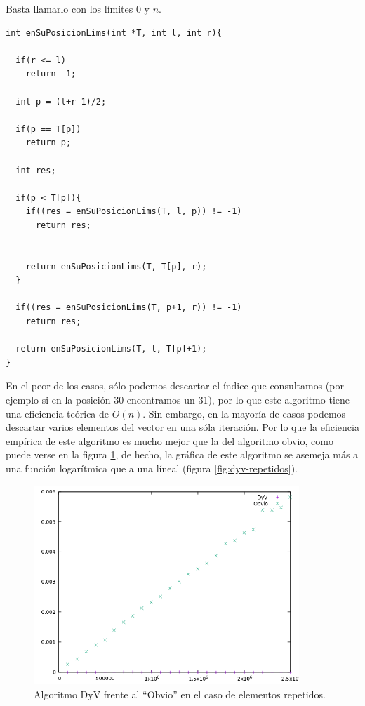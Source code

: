 \documentclass[a4]{article}
\begin{document}
Basta llamarlo con los límites 0 y $n$.

\begin{lstlisting}
int enSuPosicionLims(int *T, int l, int r){

  if(r <= l)
    return -1;
  
  int p = (l+r-1)/2;
  
  if(p == T[p])
    return p;

  int res;
    
  if(p < T[p]){
    if((res = enSuPosicionLims(T, l, p)) != -1)
      return res;

        
    return enSuPosicionLims(T, T[p], r);
  }
    
  if((res = enSuPosicionLims(T, p+1, r)) != -1)
    return res;
      
  return enSuPosicionLims(T, l, T[p]+1);
}
\end{lstlisting}

En el peor de los casos, sólo podemos descartar el índice que
consultamos (por ejemplo si en la posición 30 encontramos un 31), por
lo que este algoritmo tiene una eficiencia teórica de $O(n)$. Sin
embargo, en la mayoría de casos podemos descartar varios elementos del
vector en una sóla iteración. Por lo que la eficiencia empírica de
este algoritmo es mucho mejor que la del algoritmo obvio, como puede
verse en la figura \ref{fig:comp-repetidos}, de hecho, la gráfica de
este algoritmo se asemeja más a una función logarítmica que a una
líneal (figura \ref{fig:dyv-repetidos}).

\begin{figure}[H]
  \centering
  \caption{Algoritmo DyV frente al ``Obvio'' en el caso de elementos repetidos.}
  \label{fig:comp-repetidos}
  \includegraphics[width=100mm]{graficos/comparacion_Repetidos}
\end{figure}
\end{document}
